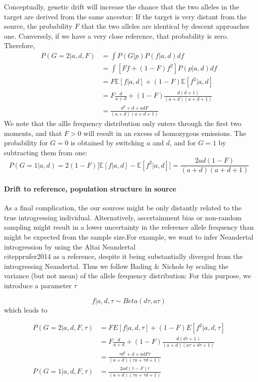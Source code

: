 \documentclass[10pt,a4paper]{article}
\newcommand{\BE}[1]{\mathbb{E}\left[#1\right]}
\begin{document}
Conceptually, genetic drift will increase the chance that the two alleles in the target are derived from the same ancestor: If the target is very distant from the source, the probability $F$ that the two alleles are identical by descent approaches one.  Conversely, if we have a very close reference, that probability is zero. Therefore,
\begin{align}
P(G=2 | a,d, F) &= \int P(G|p) P(f | a, d) df \nonumber\\
&= \int \left[ F f + (1-F) f^2\right] P(p | a, d) df\nonumber\\
&= F \BE{f|a, d} + (1-F)  \BE{f^2|a, d}\label{eq:pg}\\
&= F \frac{d}{a+d} + (1-F)  \frac{d (d+1)}{(a+d)(a+d+1)}\nonumber\\
&= \frac{d^2 + d + adF}{(a+d)(a+d+1)}
\end{align}
We note that the allle frequency distribution only enters through the first two moments, and that $F>0$ will  result in an excess of homozygous emissions. The probability for $G=0$ is obtained by switching $a$ and $d$, and for $G=1$ by subtracting them from one:
\begin{equation}
P(G=1 | a,d) = 2(1-F) \bigg[\BE{f|a,d} - \BE{f^2 | a,d}\bigg] = \frac{2ad(1-F)}{(a+d)(a+d+1)}
\end{equation} 

\paragraph{Drift to reference, population structure in source}
As a final complication, the our sources might be only distantly related to the true introgressing individual. Alternatively, ascertainment bias or non-random sampling might result in a lower uncertainty in the reference allele frequency than might be expected from the sample size.For example, we want to infer Neandertal introgression by using the Altai Neandertal \\citep{prufer2014} as a reference, despite it being substantially diverged from the introgressing Neandertal. Thus we follow Bading \& Nichols by scaling the variance (but not mean) of the allele frequency distribution: For this purpose, we introduce a parameter $\tau$

\begin{equation}
f| a, d, \tau \sim Beta (d\tau, a\tau)
\end{equation}
which leads to


\begin{align}
P(G=2 | a,d, F, \tau) &= F E[f|a,d, \tau] + (1-F)  E[f^2|a, d, \tau]\nonumber\\
&= F \frac{d}{a+d} + (1-F)  \frac{d (d\tau+1)}{(a+d)(a\tau+d\tau+1)}\nonumber\\
&= \frac{\tau d^2 + d + adF\tau}{(a+d)(\tau a+\tau d+1)}\\
P(G=1 | a,d, F, \tau) &= \frac{2ad(1-F)\tau}{(a+d)(\tau a+\tau d+1)}
\end{align}
\end{document}
